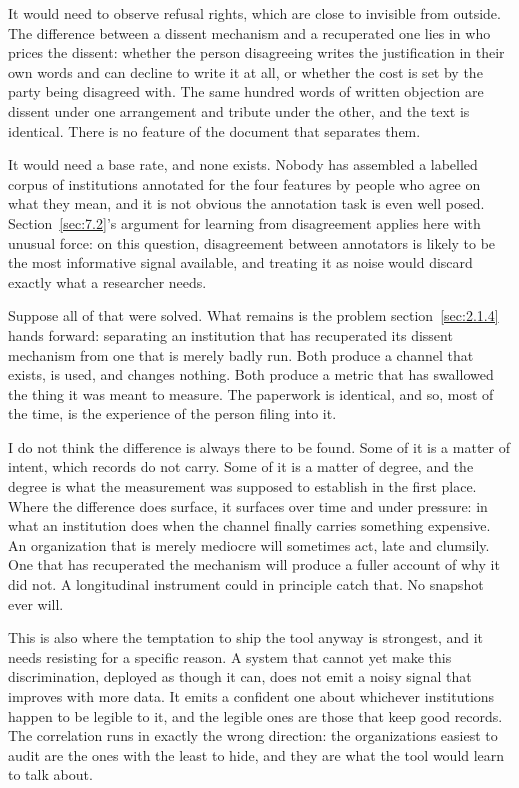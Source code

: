 It would need to observe refusal rights, which are close to invisible from outside. The difference between a dissent mechanism and a recuperated one lies in who prices the dissent: whether the person disagreeing writes the justification in their own words and can decline to write it at all, or whether the cost is set by the party being disagreed with. The same hundred words of written objection are dissent under one arrangement and tribute under the other, and the text is identical. There is no feature of the document that separates them.

It would need a base rate, and none exists. Nobody has assembled a labelled corpus of institutions annotated for the four features by people who agree on what they mean, and it is not obvious the annotation task is even well posed. Section~\ref{sec:7.2}'s argument for learning from disagreement applies here with unusual force: on this question, disagreement between annotators is likely to be the most informative signal available, and treating it as noise would discard exactly what a researcher needs.

Suppose all of that were solved. What remains is the problem section~\ref{sec:2.1.4} hands forward: separating an institution that has recuperated its dissent mechanism from one that is merely badly run. Both produce a channel that exists, is used, and changes nothing. Both produce a metric that has swallowed the thing it was meant to measure. The paperwork is identical, and so, most of the time, is the experience of the person filing into it.

I do not think the difference is always there to be found. Some of it is a matter of intent, which records do not carry. Some of it is a matter of degree, and the degree is what the measurement was supposed to establish in the first place. Where the difference does surface, it surfaces over time and under pressure: in what an institution does when the channel finally carries something expensive. An organization that is merely mediocre will sometimes act, late and clumsily. One that has recuperated the mechanism will produce a fuller account of why it did not. A longitudinal instrument could in principle catch that. No snapshot ever will.

This is also where the temptation to ship the tool anyway is strongest, and it needs resisting for a specific reason. A system that cannot yet make this discrimination, deployed as though it can, does not emit a noisy signal that improves with more data. It emits a confident one about whichever institutions happen to be legible to it, and the legible ones are those that keep good records. The correlation runs in exactly the wrong direction: the organizations easiest to audit are the ones with the least to hide, and they are what the tool would learn to talk about.

